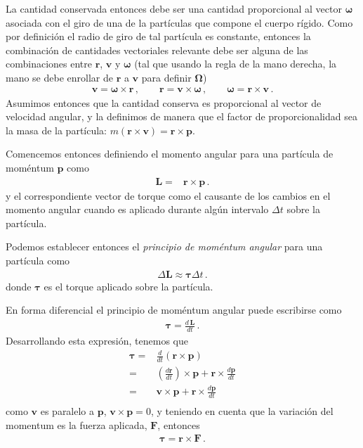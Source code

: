 La cantidad conservada entonces debe ser una cantidad proporcional al
vector $\boldsymbol{\omega}$ asociada con el giro de una de la
partículas que compone el cuerpo rígido. 
Como por definición el radio de giro de tal partícula es constante,
entonces la combinación de cantidades vectoriales relevante debe ser
alguna de las combinaciones entre $\mathbf{r}$, $\mathbf{v}$ y
$\boldsymbol{\mathbf{\omega}}$ (tal que usando la regla de la mano
derecha, la mano se debe enrollar de $\mathbf{r}$ a $\mathbf{v}$ para
definir $\boldsymbol{\Omega}$)
\begin{align*}
  \mathbf{v}=\boldsymbol{\omega}\times\mathbf{r}\,,\qquad
  \mathbf{r}=\mathbf{v}\times\boldsymbol{\omega}\,,\qquad
  \boldsymbol{\omega}=\mathbf{r}\times\mathbf{v}\,.
\end{align*}
Asumimos entonces que la cantidad conserva es proporcional al vector
de velocidad angular, y la definimos de manera que el factor de
proporcionalidad sea la masa de la partícula:
$m(\mathbf{r}\times\mathbf{v})=\mathbf{r}\times\mathbf{p}$. 

Comencemos entonces definiendo el momento angular para una partícula de moméntum $\mathbf{p}$ como
\begin{align}
  \label{eq:L}
  \mathbf{L}=&\mathbf{r}\times\mathbf{p}\,.
\end{align}
y el correspondiente vector de torque como el causante de los cambios
en el momento angular cuando es aplicado durante algún intervalo
$\Delta t$ sobre la partícula. 

Podemos establecer entonces el \emph{principio de moméntum angular}
para una partícula como
\begin{align}
  \Delta \mathbf{L}\approx \boldsymbol{\tau}\Delta t\,.
\end{align}
donde $\boldsymbol{\tau}$ es el torque aplicado sobre la partícula. 

En forma diferencial el principio de moméntum angular puede escribirse como
\begin{align}
\label{eq:tautor}
  \boldsymbol{\tau}=\frac{d\,\mathbf{L}}{dt}\,.
\end{align}
Desarrollando esta expresión, tenemos que
\begin{align}
  \boldsymbol{\tau}=&\frac{d}{dt}\left(\mathbf{r}\times\mathbf{p}\right)\nonumber\\
=&\left(\frac{d\mathbf{r}}{dt}\right)\times\mathbf{p}+
\mathbf{r}\times\frac{d\mathbf{p}}{dt}\nonumber\\
=&\mathbf{v}\times\mathbf{p}+
\mathbf{r}\times\frac{d\mathbf{p}}{dt}\nonumber\\
\end{align}
como $\mathbf{v}$ es paralelo a $\mathbf{p}$,
$\mathbf{v}\times\mathbf{p}=0$, y teniendo en cuenta que la variación
del momentum es la fuerza aplicada, $\mathbf{F}$, entonces
\begin{align}
  \label{eq:torqueini}
  \boldsymbol{\tau}=\mathbf{r}\times\mathbf{F}\,.
\end{align}

